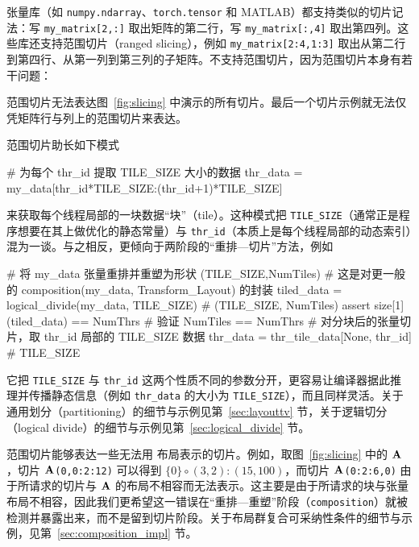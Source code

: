 张量库（如 {\tt numpy.ndarray}、{\tt torch.tensor} 和 MATLAB）都支持类似的切片记法：写 {\tt my\_matrix[2\allowbreak{},:]} 取出矩阵的第二行，写 {\tt my\_matrix[:,\allowbreak{}4]} 取出第四列。这些库还支持范围切片（ranged slicing），例如 {\tt my\_matrix[2:4\allowbreak{},1:3]} 取出从第二行到第四行、从第一列到第三列的子矩阵。\CuTe 不支持范围切片，因为范围切片本身有若干问题：
\begin{compactitem}
\item 范围切片无法表达图~\ref{fig:slicing} 中演示的所有切片。最后一个切片示例就无法仅凭矩阵行与列上的范围切片来表达。
\item 范围切片助长如下模式
\begin{python}
# 为每个 thr_id 提取 TILE_SIZE 大小的数据
thr_data = my_data[thr_id*TILE_SIZE:(thr_id+1)*TILE_SIZE]
\end{python}
来获取每个线程局部的一块数据“块”（tile）。这种模式把 {\tt TILE\_SIZE}（通常正是程序想要在其上做优化的静态常量）与 {\tt thr\_id}（本质上是每个线程局部的动态索引）混为一谈。与之相反，\CuTe 更倾向于两阶段的“重排—切片”方法，例如
\begin{python}
# 将 my_data 张量重排并重塑为形状 (TILE_SIZE,NumTiles)
# 这是对更一般的 composition(my_data, Transform_Layout) 的封装
tiled_data = logical_divide(my_data, TILE_SIZE)  # (TILE_SIZE, NumTiles)
assert size[1](tiled_data) == NumThrs            # 验证 NumTiles == NumThrs
# 对分块后的张量切片，取 thr_id 局部的 TILE_SIZE 数据
thr_data = thr_tile_data[None, thr_id]           # TILE_SIZE
\end{python}
它把 {\tt TILE\_SIZE} 与 {\tt thr\_id} 这两个性质不同的参数分开，更容易让编译器据此推理并传播静态信息（例如 {\tt thr\_data} 的大小为 {\tt TILE\_SIZE}），而且同样灵活。关于通用划分（partitioning）的细节与示例见第~\ref{sec:layouttv} 节，关于逻辑切分（logical divide）的细节与示例见第~\ref{sec:logical_divide} 节。
\item 范围切片能够表达一些无法用 \CuTe 布局表示的切片。例如，取图~\ref{fig:slicing} 中的 $\mathbf{A}$，切片 {\tt $\mathbf{A}$(0,0:2:12)} 可以得到 $\{0\} \circ (3,2):(15,100)$，而切片 {\tt $\mathbf{A}$(0:2:6,0)} 由于所请求的切片与 $\mathbf{A}$ 的布局不相容而无法表示。这主要是由于所请求的块与张量布局不相容，因此我们更希望这一错误在“重排—重塑”阶段（{\tt composition}）就被检测并暴露出来，而不是留到切片阶段。关于布局群复合可采纳性条件的细节与示例，见第~\ref{sec:composition_impl} 节。
\end{compactitem}

